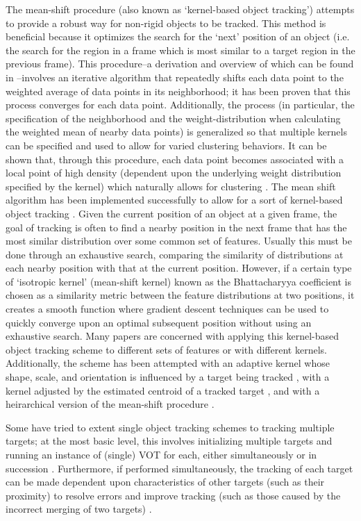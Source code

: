 \documentclass{article}
\begin{document}
The mean-shift procedure (also known as `kernel-based object tracking') attempts to provide a robust way for non-rigid objects to be tracked. This method is beneficial because it optimizes the search for the `next' position of an object (i.e. the search for the region in a frame which is most similar to a target region in the previous frame). This procedure--a derivation and overview of which can be found in \citep{fukunaga_1975, cheng_1995}--involves an iterative algorithm that repeatedly shifts each data point to the weighted average of data points in its neighborhood; it has been proven that this process converges for each data point. Additionally, the process (in particular, the specification of the neighborhood and the weight-distribution when calculating the weighted mean of nearby data points) is generalized so that multiple kernels can be specified and used to allow for varied clustering behaviors. It can be shown that, through this procedure, each data point becomes associated with a local point of high density (dependent upon the underlying weight distribution specified by the kernel) which naturally allows for clustering \citep{cheng_1995}. The mean shift algorithm has been implemented successfully to allow for a sort of kernel-based object tracking \citep{comaniciu_2003, comaniciu_1999, comaniciu_2000}. Given the current position of an object at a given frame, the goal of tracking is often to find a nearby position in the next frame that has the most similar distribution over some common set of features. Usually this must be done through an exhaustive search, comparing the similarity of distributions at each nearby position with that at the current position. However, if a certain type of `isotropic kernel' (mean-shift kernel) known as the Bhattacharyya coefficient is chosen as a similarity metric between the feature distributions at two positions, it creates a smooth function where gradient descent techniques can be used to quickly converge upon an optimal subsequent position without using an exhaustive search. Many papers are concerned with applying this kernel-based object tracking scheme to different sets of features or with different kernels. Additionally, the scheme has been attempted with an adaptive kernel whose shape, scale, and orientation is influenced by a target being tracked \citep{wang_2004}, with a kernel adjusted by the estimated centroid of a tracked target \citep{mehmood_2009}, and with a heirarchical version of the mean-shift procedure \citep{dementhon_2002}. 

Some have tried to extent single object tracking schemes to tracking multiple targets; at the most basic level, this involves initializing multiple targets and running an instance of (single) VOT for each, either simultaneously or in succession \citep{perez_2002}. Furthermore, if performed simultaneously, the tracking of each target can be made dependent upon characteristics of other targets (such as their proximity) to resolve errors and improve tracking (such as those caused by the incorrect merging of two targets) \citep{khan_2004, vermaak_2003} . 
\end{document}
